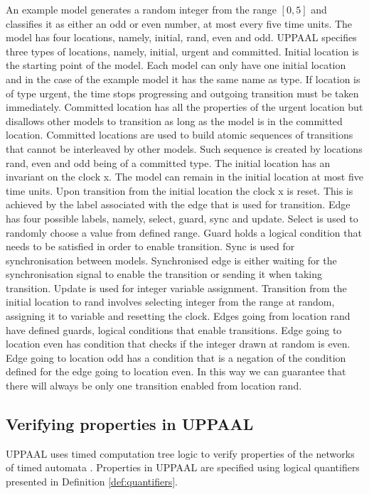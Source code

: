 An example model generates a random integer from the range $[0, 5]$ and classifies it as either an odd or even number, at most every five time units. The model has four locations, namely, initial, rand, even and odd. UPPAAL specifies three types of locations, namely, initial, urgent and committed. Initial location is the starting point of the model. Each model can only have one initial location and in the case of the example model it has the same name as type. If location is of type urgent, the time stops progressing and outgoing transition must be taken immediately. Committed location has all the properties of the urgent location but disallows other models to transition as long as the model is in the committed location. Committed locations are used to build atomic sequences of transitions that cannot be interleaved by other models. Such sequence is created by locations rand, even and odd being of a committed type. The initial location has an invariant on the clock x. The model can remain in the initial location at most five time units. Upon transition from the initial location the clock x is reset. This is achieved by the label associated with the edge that is used for transition. Edge has four possible labels, namely, select, guard, sync and update. Select is used to randomly choose a value from defined range. Guard holds a logical condition that needs to be satisfied in order to enable transition. Sync is used for synchronisation between models. Synchronised edge is either waiting for the synchronisation signal to enable the transition or sending it when taking transition. Update is used for integer variable assignment. Transition from the initial location to rand involves selecting integer from the range at random, assigning it to variable and resetting the clock. Edges going from location rand have defined guards, logical conditions that enable transitions. Edge going to location even has condition that checks if the integer drawn at random is even. Edge going to location odd has a condition that is a negation of the condition defined for the edge going to location even. In this way we can guarantee that there will always be only one transition enabled from location rand.

\subsection{Verifying properties in UPPAAL}
UPPAAL uses timed computation tree logic to verify properties of the networks of timed automata \cite{Timed_Automata_Semantics_Algorithms_and_Tools}.
Properties in UPPAAL are specified using logical quantifiers presented in Definition \ref{def:quantifiers}.

